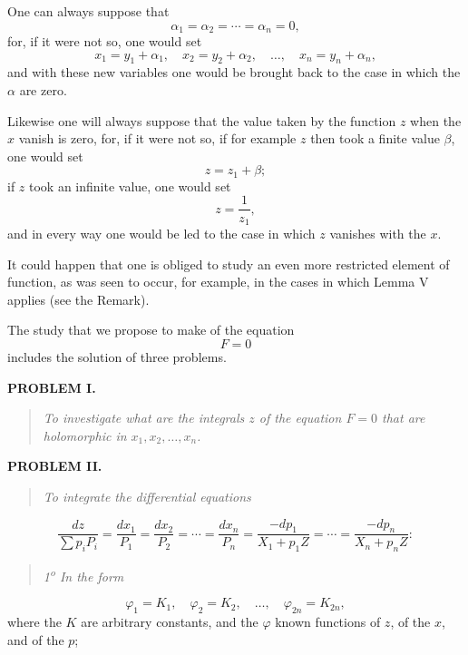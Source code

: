 \documentclass[11pt]{article}
\begin{document}
One can always suppose that
\[
\alpha_1=\alpha_2=\cdots=\alpha_n=0,
\]
for, if it were not so, one would set
\[
x_1=y_1+\alpha_1,
\quad x_2=y_2+\alpha_2,
\quad \ldots,
\quad x_n=y_n+\alpha_n,
\]
and with these new variables one would be brought back to the case in which the $\alpha$ are zero.

Likewise one will always suppose that the value taken by the function $z$ when the $x$ vanish is zero, for, if it were not so, if for example $z$ then took a finite value $\beta$, one would set
\[
z=z_1+\beta;
\]
if $z$ took an infinite value, one would set
\[
z=\frac1{z_1},
\]
and in every way one would be led to the case in which $z$ vanishes with the $x$.

It could happen that one is obliged to study an even more restricted element of function, as was seen to occur, for example, in the cases in which Lemma V applies (see the Remark).

The study that we propose to make of the equation
\[
F=0
\]
includes the solution of three problems.

\begin{center}
\textbf{PROBLEM I.}
\end{center}

\begin{quote}\itshape
To investigate what are the integrals $z$ of the equation $F=0$ that are holomorphic in $x_1,x_2,\ldots,x_n$.
\end{quote}

\begin{center}
\textbf{PROBLEM II.}
\end{center}

\begin{quote}\itshape
To integrate the differential equations
\end{quote}
\begin{equation*}\tag{4}
\frac{dz}{\sum p_iP_i}=\frac{dx_1}{P_1}=\frac{dx_2}{P_2}=\cdots=\frac{dx_n}{P_n}=\frac{-dp_1}{X_1+p_1Z}=\cdots=\frac{-dp_n}{X_n+p_nZ}:
\end{equation*}
\begin{quote}\itshape
1\textsuperscript{o} In the form
\end{quote}
\begin{equation*}\tag{5}
\varphi_1=K_1,
\quad \varphi_2=K_2,
\quad \ldots,
\quad \varphi_{2n}=K_{2n},
\end{equation*}
where the $K$ are arbitrary constants, and the $\varphi$ known functions of $z$, of the $x$, and of the $p$;
\end{document}
